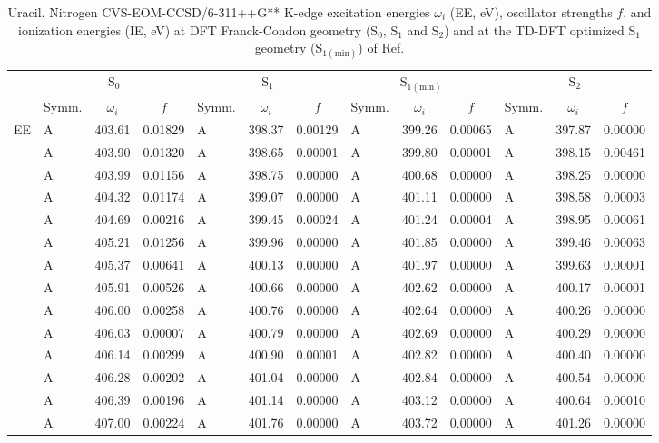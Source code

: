 \documentclass[journal=jctcce,manuscript=article]{achemso}
\begin{document}
\begin{table}
\caption{Uracil. Nitrogen CVS-EOM-CCSD/6-311++G** K-edge excitation energies $\omega_i$ (EE, eV), oscillator strengths $f$, and ionization energies (IE, eV) at DFT Franck-Condon geometry (S$_0$, S$_1$ and S$_2$) and at the TD-DFT optimized S$_1$ geometry (S$_{1(\text{min})}$) of Ref.
\label{Tab:Uracil_DFT}}
\scriptsize
\begin{tabular}{l|lcc|lcc|lcc|lcc}
\cline{2-13}
& \multicolumn{3}{c|}{S$_0$}
& \multicolumn{3}{c|}{S$_1$}  
& \multicolumn{3}{c|}{S$_{1(\text{min})}$}
& \multicolumn{3}{c}{S$_2$}
\\
\cline{2-13}
& Symm. & $\omega_i$ & $f$ 
& Symm. & $\omega_i$ & $f$ 
& Symm. & $\omega_i$ & $f$ 
& Symm. & $\omega_i$ & $f$\\
\hline
  EE 
& A & 403.61 & 0.01829 & A & 398.37 & 0.00129 & A & 399.26 & 0.00065 & A & 397.87 & 0.00000 \\
& A & 403.90 & 0.01320 & A & 398.65 & 0.00001 & A & 399.80 & 0.00001 & A & 398.15 & 0.00461 \\
& A & 403.99 & 0.01156 & A & 398.75 & 0.00000 & A & 400.68 & 0.00000 & A & 398.25 & 0.00000 \\
& A & 404.32 & 0.01174 & A & 399.07 & 0.00000 & A & 401.11 & 0.00000 & A & 398.58 & 0.00003 \\
& A & 404.69 & 0.00216 & A & 399.45 & 0.00024 & A & 401.24 & 0.00004 & A & 398.95 & 0.00061 \\
& A & 405.21 & 0.01256 & A & 399.96 & 0.00000 & A & 401.85 & 0.00000 & A & 399.46 & 0.00063 \\
& A & 405.37 & 0.00641 & A & 400.13 & 0.00000 & A & 401.97 & 0.00000 & A & 399.63 & 0.00001 \\
& A & 405.91 & 0.00526 & A & 400.66 & 0.00000 & A & 402.62 & 0.00000 & A & 400.17 & 0.00001 \\
& A & 406.00 & 0.00258 & A & 400.76 & 0.00000 & A & 402.64 & 0.00000 & A & 400.26 & 0.00000 \\
& A & 406.03 & 0.00007 & A & 400.79 & 0.00000 & A & 402.69 & 0.00000 & A & 400.29 & 0.00000 \\
& A & 406.14 & 0.00299 & A & 400.90 & 0.00001 & A & 402.82 & 0.00000 & A & 400.40 & 0.00000 \\
& A & 406.28 & 0.00202 & A & 401.04 & 0.00000 & A & 402.84 & 0.00000 & A & 400.54 & 0.00000 \\
& A & 406.39 & 0.00196 & A & 401.14 & 0.00000 & A & 403.12 & 0.00000 & A & 400.64 & 0.00010 \\
& A & 407.00 & 0.00224 & A & 401.76 & 0.00000 & A & 403.72 & 0.00000 & A & 401.26 & 0.00000 \\

\end{tabular}
\end{table}
\end{document}
